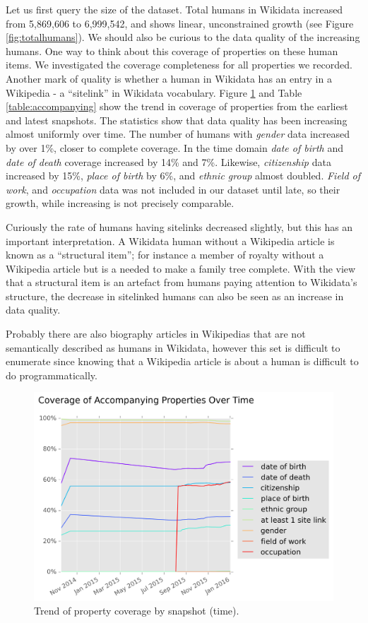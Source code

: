 \documentclass[letterpaper]{article}
\begin{document}
Let us first query the size of the dataset. Total humans in Wikidata increased from 5,869,606 to 6,999,542, and shows linear, unconstrained growth (see Figure \ref{fig:totalhumans}).
We should also be curious to the data quality of the increasing humans. One way to think about this coverage of properties on these human items. We investigated the coverage completeness for all  properties we recorded. Another mark of quality is whether a human in Wikidata has an entry in a Wikipedia - a ``sitelink'' in Wikidata vocabulary. Figure \ref{fig:accompanying} and Table \ref{table:accompanying} show the trend in coverage of properties from the earliest and latest snapshots. The statistics show that data quality has been increasing almost uniformly over time. The number of humans with \textit{gender} data increased by over 1\%, closer to complete coverage. In the time domain \textit{date of birth} and \textit{date of death} coverage increased by 14\% and 7\%. Likewise, \textit{citizenship} data increased by 15\%, \textit{place of birth} by 6\%, and \textit{ethnic group} almost doubled. \textit{Field of work}, and \textit{occupation} data was not included in our dataset until late, so their growth, while increasing is not precisely comparable.

Curiously the rate of humans having sitelinks decreased slightly, but this has an important interpretation. A Wikidata human without a Wikipedia article is known as a ``structural item''; for instance a member of royalty without a Wikipedia article but is a needed to make a family tree complete. With the view that a structural item is an artefact from humans paying attention to Wikidata's structure, the decrease in sitelinked humans can also be seen as an increase in data quality.

Probably there are also biography articles in Wikipedias that are not semantically described as humans in Wikidata, however this set is difficult to enumerate since knowing that a Wikipedia article is about a human is difficult to do programmatically.


\begin{figure}
\includegraphics[scale=0.5]{figures/additionalprops.png}
\caption{Trend of property coverage by snapshot (time).}
\label{fig:accompanying}
\end{figure}
\end{document}
